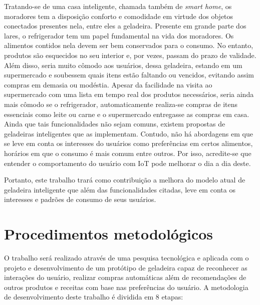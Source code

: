 Tratando-se de uma casa inteligente, chamada também de \textit{smart home}, os moradores tem a disposição conforto e comodidade em virtude dos objetos conectados presentes nela, entre eles a geladeira. Presente em grande parte dos lares, o refrigerador tem um papel fundamental na vida dos moradores. Os alimentos contidos nela devem ser bem conservados para o consumo. No entanto, produtos são esquecidos no seu interior e, por vezes, passam do prazo de validade. Além disso, seria muito cômodo aos usuários, dessa geladeira, estando em um supermercado e soubessem quais itens estão faltando ou vencidos, evitando assim compras em demasia ou modéstia. Apesar da facilidade na visita ao supermercado com uma lista em tempo real dos produtos necessários, seria ainda mais cômodo se o refrigerador, automaticamente realiza-se compras de itens essenciais como leite ou carne e o supermercado entregasse as compras em casa. Ainda que tais funcionalidades não sejam comuns, existem propostas de geladeiras inteligentes que as implementam. Contudo, não há abordagens em que se leve em conta os interesses do usuários como preferências em certos alimentos, horários em que o consumo é mais comum entre outros. Por isso, acredite-se que entender o comportamento do usuário com IoT pode melhorar o dia a dia deste.

Portanto, este trabalho trará como contribuição a melhora do modelo atual de geladeira inteligente que além das funcionalidades citadas, leve em conta os interesses e padrões de consumo de seus usuários.




\section{Procedimentos metodológicos}

O trabalho será realizado através de uma pesquisa tecnológica e aplicada com o projeto e desenvolvimento de um protótipo de geladeira capaz de reconhecer as interações do usuário, realizar compras automáticas além de recomendações de outros produtos e receitas com base nas preferências do usuário. A metodologia de desenvolvimento deste trabalho é dividida em 8 etapas:


